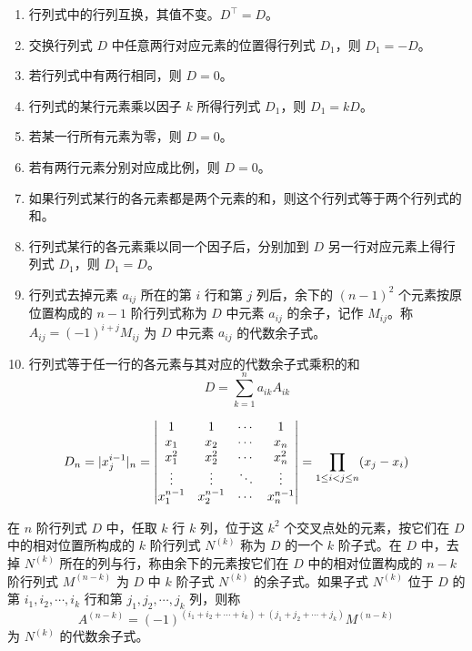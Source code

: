 \documentclass{ctexbook}
\begin{document}
\begin{proposition}[行列式的性质]
    \begin{enumerate}
        \item 行列式中的行列互换，其值不变。$D^\top=D$。
        \item 交换行列式 $D$ 中任意两行对应元素的位置得行列式 $D_1$，则 $D_1=-D$。
        \item 若行列式中有两行相同，则 $D=0$。
        \item 行列式的某行元素乘以因子 $k$ 所得行列式 $D_1$，则 $D_1=kD$。
        \item 若某一行所有元素为零，则 $D=0$。
        \item 若有两行元素分别对应成比例，则 $D=0$。
        \item 如果行列式某行的各元素都是两个元素的和，则这个行列式等于两个行列式的和。
        \item 行列式某行的各元素乘以同一个因子后，分别加到 $D$ 另一行对应元素上得行列式 $D_1$，则 $D_1=D$。
        \item 行列式去掉元素 $a_{ij}$ 所在的第 $i$ 行和第 $j$ 列后，余下的 $(n-1)^2$ 个元素按原位置构成的 $n-1$ 阶行列式称为 $D$ 中元素 $a_{ij}$ 的余子，记作 $M_{ij}$。称 $A_{ij}=(-1)^{i+j}M_{ij}$ 为 $D$ 中元素 $a_{ij}$ 的代数余子式。
        \item 行列式等于任一行的各元素与其对应的代数余子式乘积的和
        \begin{equation}
            D=\sum_{k=1}^n a_{ik}A_{ik}
        \end{equation}
    \end{enumerate}
\end{proposition}

\begin{proposition}[范德蒙德行列式]
    \begin{equation}
        D_n=|x_j^{i-1}|_n=\mqty|1 & 1 & \cdots & 1\\
        x_1 & x_2 & \cdots & x_n \\
        x_1^2 & x_2^2 & \cdots & x_n^2\\
        \vdots & \vdots & \ddots & \vdots \\
        x_1^{n-1} & x_2^{n-1} & \cdots & x_n^{n-1}|=\prod_{1\leq i<j\leq n}(x_j-x_i)
    \end{equation}
\end{proposition}

\begin{definition}[子式]
    在 $n$ 阶行列式 $D$ 中，任取 $k$ 行 $k$ 列，位于这 $k^2$ 个交叉点处的元素，按它们在 $D$ 中的相对位置所构成的 $k$ 阶行列式 $N^{(k)}$ 称为 $D$ 的一个 $k$ 阶子式。在 $D$ 中，去掉 $N^{(k)}$ 所在的列与行，称由余下的元素按它们在 $D$ 中的相对位置构成的 $n-k$ 阶行列式 $M^{(n-k)}$ 为 $D$ 中 $k$ 阶子式 $N^{(k)}$ 的余子式。如果子式 $N^{(k)}$ 位于 $D$ 的第 $i_1,i_2,\cdots,i_k$ 行和第 $j_1,j_2,\cdots,j_k$ 列，则称
    \begin{equation}
        A^{(n-k)}=(-1)^{(i_1+i_2+\cdots+i_k)+(j_1+j_2+\cdots+j_k)}M^{(n-k)}
    \end{equation}
    为 $N^{(k)}$ 的代数余子式。
\end{definition}
\end{document}

